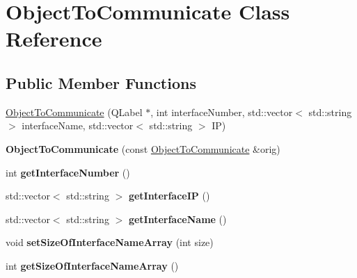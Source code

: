 \hypertarget{class_object_to_communicate}{\section{Object\-To\-Communicate Class Reference}
\label{class_object_to_communicate}
}
\subsection*{Public Member Functions}
\begin{DoxyCompactItemize}
\item 
\hyperlink{class_object_to_communicate_a91b32de5661baed40db971e520c433c8}{Object\-To\-Communicate} (Q\-Label $\ast$, int interface\-Number, std\-::vector$<$ std\-::string $>$ interface\-Name, std\-::vector$<$ std\-::string $>$ I\-P)
\item 
\hypertarget{class_object_to_communicate_ae152546996c6fbd6e6a5e7866615fd01}{{\bfseries Object\-To\-Communicate} (const \hyperlink{class_object_to_communicate}{Object\-To\-Communicate} \&orig)}\label{class_object_to_communicate_ae152546996c6fbd6e6a5e7866615fd01}

\item 
\hypertarget{class_object_to_communicate_a11e6f79e6f571e799e64a907c6e3c51d}{int {\bfseries get\-Interface\-Number} ()}\label{class_object_to_communicate_a11e6f79e6f571e799e64a907c6e3c51d}

\item 
\hypertarget{class_object_to_communicate_a86a232208ef2f9772eb3278fa60c08b2}{std\-::vector$<$ std\-::string $>$ {\bfseries get\-Interface\-I\-P} ()}\label{class_object_to_communicate_a86a232208ef2f9772eb3278fa60c08b2}

\item 
\hypertarget{class_object_to_communicate_a602740c7ca436411a6aff2cca4be8ec9}{std\-::vector$<$ std\-::string $>$ {\bfseries get\-Interface\-Name} ()}\label{class_object_to_communicate_a602740c7ca436411a6aff2cca4be8ec9}

\item 
\hypertarget{class_object_to_communicate_a8df0b39e9e12a41316ab348a14f9eb5e}{void {\bfseries set\-Size\-Of\-Interface\-Name\-Array} (int size)}\label{class_object_to_communicate_a8df0b39e9e12a41316ab348a14f9eb5e}

\item 
\hypertarget{class_object_to_communicate_a884b285832d5fcdbbce8d75e76a1a0c3}{int {\bfseries get\-Size\-Of\-Interface\-Name\-Array} ()}\label{class_object_to_communicate_a884b285832d5fcdbbce8d75e76a1a0c3}


\end{DoxyCompactItemize}
